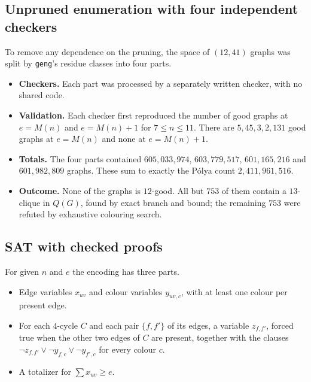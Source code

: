 \documentclass[11pt]{amsart}
\theoremstyle{definition}
\newcommand{\M}{M}
\begin{document}
\subsection{Unpruned enumeration with four independent checkers}
To remove any dependence on the pruning, the space of $(12,41)$ graphs was split by
\texttt{geng}'s residue classes into four parts.
\begin{itemize}
\item \textbf{Checkers.} Each part was processed by a separately written checker, with no
  shared code.
\item \textbf{Validation.} Each checker first reproduced the number of good graphs at
  $e=\M(n)$ and $e=\M(n)+1$ for $7\le n\le 11$. There are $5,45,3,2,131$ good graphs at
  $e=\M(n)$ and none at $e=\M(n)+1$.
\item \textbf{Totals.} The four parts contained $605{,}033{,}974$, $603{,}779{,}517$,
  $601{,}165{,}216$ and $601{,}982{,}809$ graphs. These sum to exactly the P\'olya count
  $2{,}411{,}961{,}516$.
\item \textbf{Outcome.} None of the graphs is $12$-good. All but $753$ of them contain a
  $13$-clique in $Q(G)$, found by exact branch and bound; the remaining $753$ were refuted by
  exhaustive colouring search.
\end{itemize}

\subsection{SAT with checked proofs}\label{sec:sat}
For given $n$ and $e$ the encoding has three parts.
\begin{itemize}
\item Edge variables $x_{uv}$ and colour variables $y_{uv,c}$, with at least one colour per
  present edge.
\item For each $4$-cycle $C$ and each pair $\{f,f'\}$ of its edges, a variable $z_{f,f'}$,
  forced true when the other two edges of $C$ are present, together with the clauses
  $\neg z_{f,f'}\vee\neg y_{f,c}\vee\neg y_{f',c}$ for every colour $c$.
\item A totalizer for $\sum x_{uv}\ge e$.
\end{itemize}
\end{document}
